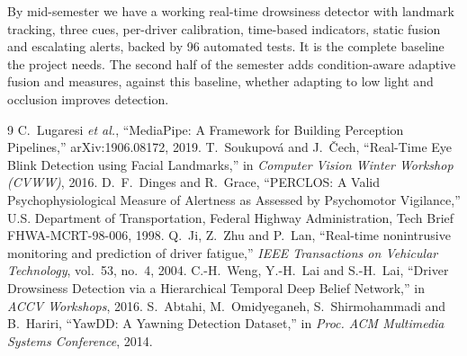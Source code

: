 \documentclass[12pt,a4paper]{article}
\begin{document}
By mid-semester we have a working real-time drowsiness detector with landmark tracking, three cues, per-driver calibration, time-based indicators, static fusion and escalating alerts, backed by 96 automated tests. It is the complete baseline the project needs. The second half of the semester adds condition-aware adaptive fusion and measures, against this baseline, whether adapting to low light and occlusion improves detection.

\begin{singlespace}\small
\begin{thebibliography}{9}
 C.~Lugaresi \emph{et al.}, ``MediaPipe: A Framework for Building Perception Pipelines,'' arXiv:1906.08172, 2019.
 T.~Soukupov\'a and J.~\v{C}ech, ``Real-Time Eye Blink Detection using Facial Landmarks,'' in \emph{Computer Vision Winter Workshop (CVWW)}, 2016.
 D.~F.~Dinges and R.~Grace, ``PERCLOS: A Valid Psychophysiological Measure of Alertness as Assessed by Psychomotor Vigilance,'' U.S. Department of Transportation, Federal Highway Administration, Tech Brief FHWA-MCRT-98-006, 1998.
 Q.~Ji, Z.~Zhu and P.~Lan, ``Real-time nonintrusive monitoring and prediction of driver fatigue,'' \emph{IEEE Transactions on Vehicular Technology}, vol.~53, no.~4, 2004.
 C.-H.~Weng, Y.-H.~Lai and S.-H.~Lai, ``Driver Drowsiness Detection via a Hierarchical Temporal Deep Belief Network,'' in \emph{ACCV Workshops}, 2016.
 S.~Abtahi, M.~Omidyeganeh, S.~Shirmohammadi and B.~Hariri, ``YawDD: A Yawning Detection Dataset,'' in \emph{Proc. ACM Multimedia Systems Conference}, 2014.
\end{thebibliography}
\end{singlespace}
\end{document}
